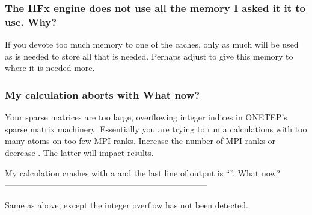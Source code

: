 \documentclass[letterpaper,10pt,english]{sphinxmanual}
\begin{document}
\subsubsection{The HFx engine does not use all the memory I asked it it to use. Why?}
\label{\detokenize{hfx:the-hfx-engine-does-not-use-all-the-memory-i-asked-it-it-to-use-why}}
If you devote too much memory to one of the caches, only as much will be
used as is needed to store all that is needed. Perhaps adjust
 to give this memory to where it is needed more.


\subsubsection{My calculation aborts with  What now?}
\label{\detokenize{hfx:my-calculation-aborts-with-error-in-sparse-count-ss-integer-overflow-in-sparse-matrix-index-detected-what-now}}
Your sparse matrices are too large, overflowing integer indices in
ONETEP’s sparse matrix machinery. Essentially you are trying to run a
calculations with too many atoms on too few MPI ranks. Increase the
number of MPI ranks or decrease . The latter will impact
results.

My calculation crashes with a  and the last line of output is
“”. What now?
————————————————————————

Same as above, except the integer overflow has not been detected.
\end{document}
